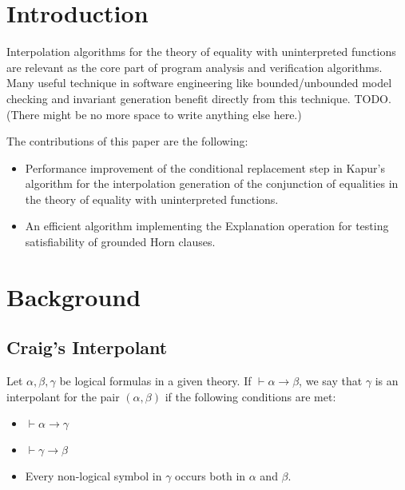 \documentclass[sigconf,authordraft]{acmart}
\begin{document}
\maketitle

\section{Introduction}

Interpolation algorithms for the theory of equality with uninterpreted functions are relevant
as the core part of program analysis and verification algorithms. Many useful technique in software
engineering like bounded/unbounded model checking and invariant generation benefit directly from
this technique. TODO. (There might be no more space to write anything else here.)

The contributions of this paper are the following:
\begin{itemize}
\item Performance improvement of the conditional replacement step in Kapur's algorithm
  for the interpolation generation of the conjunction of equalities in the theory of equality with
  uninterpreted functions.
\item An efficient algorithm implementing the Explanation operation
  for testing satisfiability of grounded Horn clauses.
\end{itemize}

\section{Background}

\subsection{Craig's Interpolant}

Let $\alpha, \beta, \gamma$ be logical formulas in a given theory. If
$\vdash \alpha \rightarrow \beta$, we say that $\gamma$ is an
interpolant for the pair $(\alpha, \beta)$ if the following conditions
are met:

\begin{itemize}
\item $\vdash \alpha \rightarrow \gamma$
\item $\vdash \gamma \rightarrow \beta$
\item Every non-logical symbol in $\gamma$ occurs both in $\alpha$ and
  $\beta$.
\end{itemize}
\end{document}
